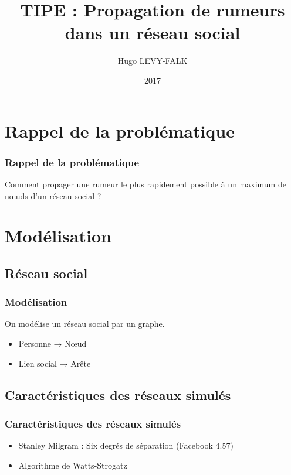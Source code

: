 \documentclass{beamer}
\title[Propagation de rumeurs dans un réseau social]{TIPE : Propagation de rumeurs dans un réseau social}
\author{Hugo LEVY-FALK}
\date{2017}
\begin{document}
\begin{frame}
  \titlepage
\end{frame}

\section{Rappel de la problématique}
\begin{frame}
  \frametitle{Rappel de la problématique}
  \begin{center}
  Comment propager une rumeur le plus rapidement possible à un maximum de nœuds d'un réseau social ?
  \end{center}
\end{frame}

\section{Modélisation}
\subsection{Réseau social}
\begin{frame}
  \frametitle{Modélisation}
  On modélise un réseau social par un graphe.
  \begin{itemize}
    \item<2-> Personne → Nœud
    \item<3-> Lien social → Arête
  \end{itemize}
\end{frame}
\subsection{Caractéristiques des réseaux simulés}
\begin{frame}
  \frametitle{Caractéristiques des réseaux simulés}
  \begin{itemize}
    \item<2-> Stanley Milgram : Six degrés de séparation (Facebook 4.57)
    \item<3-> Algorithme de Watts-Strogatz
  \end{itemize}
\end{frame}
\end{document}
